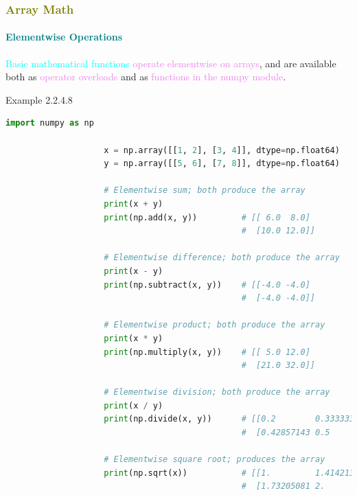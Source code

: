 \documentclass{book}
\begin{document}
\newpage
\textcolor{olive}{\subsubsection{Array Math}}
\textcolor{teal}{\paragraph{Elementwise Operations}}
\textcolor{cyan}{Basic mathematical functions}  \textcolor{violet}{operate elementwise on arrays}, and are available both as \textcolor{violet}{operator overloads} and as \textcolor{violet}{functions in the numpy module}.

\begin{egBox}{Example 2.2.4.8}{}
    \begin{lstlisting}[language=Python, basicstyle=\ttfamily\small, keywordstyle=\color{blue}, commentstyle=\color{forestgreen}, stringstyle=\color{red}, showstringspaces=false]
                    import numpy as np

                    x = np.array([[1, 2], [3, 4]], dtype=np.float64)
                    y = np.array([[5, 6], [7, 8]], dtype=np.float64)

                    # Elementwise sum; both produce the array
                    print(x + y)
                    print(np.add(x, y))         # [[ 6.0  8.0]
                                                #  [10.0 12.0]]

                    # Elementwise difference; both produce the array
                    print(x - y)
                    print(np.subtract(x, y))    # [[-4.0 -4.0]
                                                #  [-4.0 -4.0]]

                    # Elementwise product; both produce the array
                    print(x * y)
                    print(np.multiply(x, y))    # [[ 5.0 12.0]
                                                #  [21.0 32.0]]

                    # Elementwise division; both produce the array
                    print(x / y)
                    print(np.divide(x, y))      # [[0.2        0.33333333]
                                                #  [0.42857143 0.5       ]]

                    # Elementwise square root; produces the array
                    print(np.sqrt(x))           # [[1.         1.41421356]
                                                #  [1.73205081 2.        ]]
    \end{lstlisting}
\end{egBox}
\end{document}
